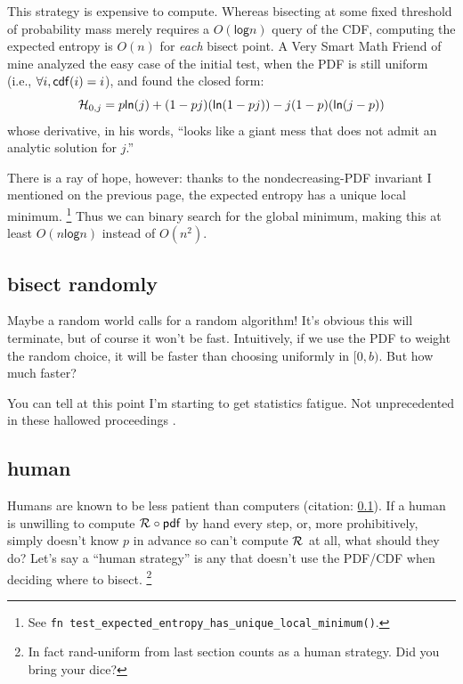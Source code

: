 \documentclass[11pt]{sigplanconf}
\begin{document}
This strategy is expensive to compute.
Whereas bisecting at some fixed threshold of probability mass merely requires a $O(\mathsf{log}  n)$ query of the CDF,
computing the expected entropy is $O(n)$ for {\it each} bisect point.
A Very Smart Math Friend of mine \cite{primer} analyzed the easy case of the initial test,
when the PDF is still uniform (i.e., $\forall i, \mathsf{cdf}(i) = i$),
and found the closed form:
\[
	\mathcal{H}_{0,j} = p \mathsf{ln}(j)
	+
	(1-pj) (\mathsf{ln} (1-pj))
	-
	j(1-p) (\mathsf{ln} (j-p))
\]
whose derivative,
in his words,
``looks like a giant mess that does not admit an analytic solution for $j$.''


There is a ray of hope, however:
thanks to the nondecreasing-PDF invariant I mentioned on the previous page,
the expected entropy has a unique local minimum.%
\footnote{See {\tt fn test\_expected\_entropy\_has\_unique\_local\_minimum()}.}
Thus we can binary search for the global minimum, making this at least $O(n\mathsf{log}n)$
instead of $O(n^2)$.

\subsection{bisect randomly}
\label{sec:random}

Maybe a random world calls for a random algorithm!
It's obvious this will terminate, but of course it won't be fast.
Intuitively, if we use the PDF to weight the random choice, it will be faster than choosing uniformly in $[0,b)$.
But how much faster?

You can tell at this point I'm starting to get statistics fatigue.
Not unprecedented in these hallowed proceedings \cite{batch-myass}.

\subsection{human}
\label{sec:human}

Humans are known to be less patient than computers (citation: \cref{sec:random}).
If a human is unwilling to compute $\mathcal{R}_{} \circ \mathsf{pdf}$ by hand every step,
or, more prohibitively,
simply doesn't know $p$ in advance so can't compute $\mathcal{R}_{}$ at all,
what should they do?
Let's say a ``human strategy'' is any that doesn't use the PDF/CDF when deciding where to bisect.%
\footnote{In fact {\sf rand-uniform} from last section counts as a human strategy. Did you bring your dice?}
\end{document}
